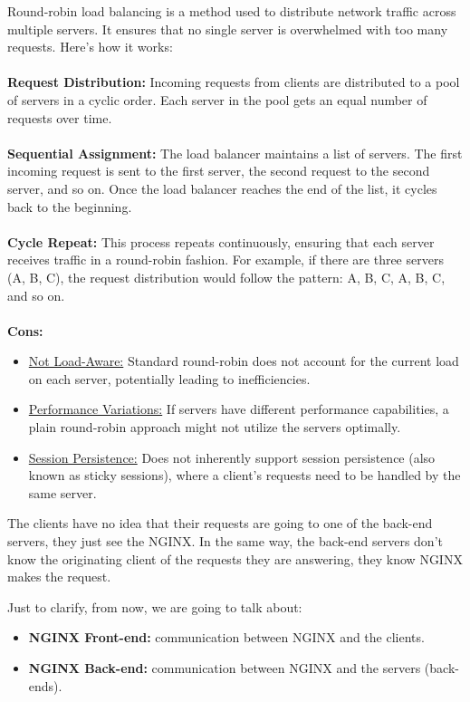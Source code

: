 \documentclass{article}
\newenvironment{blocktemplateI}[1]{%
    \tcolorbox[beamer,%
    noparskip,breakable,
    colframe=Violet,%
    colbacklower=Black,%
    title=#1]}%
    {\endtcolorbox}
\newenvironment{blocktemplateII}[1]{%
    \tcolorbox[beamer,%
    noparskip,breakable,
    colframe=Green,%
    colbacklower=LimeGreen!75!LightGreen,%
    title=#1]}%
    {\endtcolorbox}
\begin{document}
\begin{blocktemplateII}{Note}
Round-robin load balancing is a method used to distribute network traffic across multiple servers. It ensures that no single server is overwhelmed with too many requests. Here’s how it works:
\\\\
\textbf{Request Distribution:} Incoming requests from clients are distributed to a pool of servers in a cyclic order.
Each server in the pool gets an equal number of requests over time.
\\\\
\textbf{Sequential Assignment:} The load balancer maintains a list of servers.
The first incoming request is sent to the first server, the second request to the second server, and so on.
Once the load balancer reaches the end of the list, it cycles back to the beginning.
\\\\
\textbf{Cycle Repeat:} This process repeats continuously, ensuring that each server receives traffic in a round-robin fashion.
For example, if there are three servers (A, B, C), the request distribution would follow the pattern: A, B, C, A, B, C, and so on.
\\\\
\textbf{Cons:} 
\begin{itemize}
    \item \underline{Not Load-Aware:} Standard round-robin does not account for the current load on each server, potentially leading to inefficiencies.
    \item \underline{Performance Variations:} If servers have different performance capabilities, a plain round-robin approach might not utilize the servers optimally.
    \item \underline{Session Persistence:} Does not inherently support session persistence (also known as sticky sessions), where a client's requests need to be handled by the same server.
\end{itemize}
\end{blocktemplateII}

The clients have no idea that their requests are going to one of the back-end servers, they just see the NGINX. In the same way, the back-end servers don't know the originating client of the requests they are answering, they know NGINX makes the request.

\begin{blocktemplateI}{Note}
Just to clarify, from now, we are going to talk about:
\begin{itemize}
    \item \textbf{NGINX Front-end:} communication between NGINX and the clients.
    \item \textbf{NGINX Back-end:} communication between NGINX and the servers (back-ends).
\end{itemize}
\end{blocktemplateI}
\end{document}
